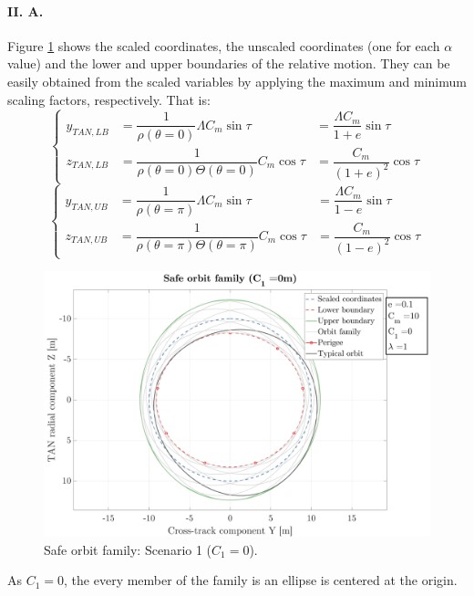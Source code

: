 		\paragraph{\textcolor{GMVred}{II. A.}  \\}
		\indent Figure \ref{figCh3:Safe_orbit_1} shows the scaled coordinates, the unscaled coordinates (one for each $\alpha$ value) and the lower and upper boundaries of the relative motion. They can be easily obtained from the scaled variables by applying the maximum and minimum scaling factors, respectively. That is:
		\begin{equation}
		\left\{ \begin{array}{llll}
		y_{TAN, LB}  & = \dfrac{1}{\rho(\theta = 0)} \Lambda C_m \sin\tau  &= \dfrac{\Lambda C_m }{1 + e} \sin\tau \\[1.3em]
		z_{TAN, LB}  & = \dfrac{1}{\rho(\theta = 0) \Theta(\theta = 0)} C_m \cos\tau  &= \dfrac{ C_m }{(1 + e)^2} \cos\tau 
		\end{array} \right.
		\label{eqCh3:LB}
		\end{equation}
		\begin{equation}
		\left\{ \begin{array}{llll}
		y_{TAN, UB}  & = \dfrac{1}{\rho(\theta = \pi)} \Lambda C_m \sin\tau  &= \dfrac{\Lambda C_m }{1 - e} \sin\tau \\[1.3em]
		z_{TAN, UB}  & = \dfrac{1}{\rho(\theta = \pi) \Theta(\theta = \pi)} C_m \cos\tau  &= \dfrac{ C_m }{(1 - e)^2} \cos\tau 
		\end{array} \right.
		\label{eqCh3:UB}
		\end{equation}
		\begin{figure}[!htb]
		\centering\includegraphics[width = \linewidth]{Chapters/Chapter_03/High_quality/Safe_orbit_C1_0}
		\caption{Safe orbit family: Scenario 1 ($C_1 = 0$).}
		\label{figCh3:Safe_orbit_1}
		\end{figure}
		\FloatBarrier
		\indent As $C_1 = 0$, the every member of the family is an ellipse is centered at the origin.
